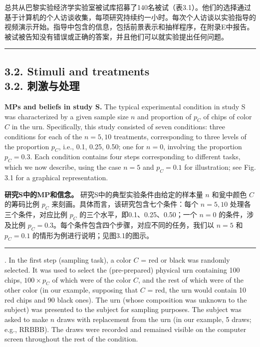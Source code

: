 \documentclass[12pt,a4paper]{article}
\newenvironment{original}
  {\par\vspace{0.5em}\noindent\color{black}\ignorespaces}
  {\par\vspace{0.3em}}
\newenvironment{translation}
  {\par\noindent\color{transblue}\ignorespaces}
  {\par\vspace{0.8em}\hrule\vspace{0.5em}}
\newcommand{\bilingualsubsection}[2]{%
  \subsection{\texorpdfstring{#1 \\[0.2em] {\normalsize\color{transblue}#2}}{#1}}
}
\begin{document}
\begin{translation}
总共从巴黎实验经济学实验室被试库招募了140名被试（表3.1）。他们的选择通过基于计算机的个人访谈收集，每项研究持续约一小时。每次个人访谈以实验指导的视频演示开始。指导中包含的信息，包括前景表示和抽样程序，在附录E中报告。被试被告知没有错误或正确的答案，并且他们可以就实验提出任何问题。
\end{translation}

\bilingualsubsection{3.2. Stimuli and treatments}{3.2. 刺激与处理}

\begin{original}
\textbf{MPs and beliefs in study S.} The typical experimental condition in study S was characterized by a given sample size $n$ and proportion of $p_C$ of chips of color $C$ in the urn. Specifically, this study consisted of seven conditions: three conditions for each of the $n = 5, 10$ treatments, corresponding to three levels of the proportion $p_C$, i.e., 0.1, 0.25, 0.50; one for $n = 0$, involving the proportion $p_C = 0.3$. Each condition contains four steps corresponding to different tasks, which we now describe, using the case $n = 5$ and $p_C = 0.1$ for illustration; see Fig. 3.1 for a graphical representation.
\end{original}

\begin{translation}
\textbf{研究S中的MP和信念。} 研究S中的典型实验条件由给定的样本量 $n$ 和瓮中颜色 $C$ 的筹码比例 $p_C$ 来刻画。具体而言，该研究包含七个条件：每个 $n = 5, 10$ 处理各三个条件，对应比例 $p_C$ 的三个水平，即0.1、0.25、0.50；一个 $n = 0$ 的条件，涉及比例 $p_C = 0.3$。每个条件包含四个步骤，对应不同的任务，我们以 $n = 5$ 和 $p_C = 0.1$ 的情形为例进行说明；见图3.1的图示。
\end{translation}

\begin{original}
1. In the first step (sampling task), a color $C$ = red or black was randomly selected. It was used to select the (pre-prepared) physical urn containing 100 chips, $100 \times p_C$ of which were of the color $C$, and the rest of which were of the other color (in our example, supposing that $C$ = red, the urn would contain 10 red chips and 90 black ones). The urn (whose composition was unknown to the subject) was presented to the subject for sampling purposes. The subject was asked to make $n$ draws with replacement from the urn (in our example, 5 draws; e.g., RRBBB). The draws were recorded and remained visible on the computer screen throughout the rest of the condition.
\end{original}
\end{document}

